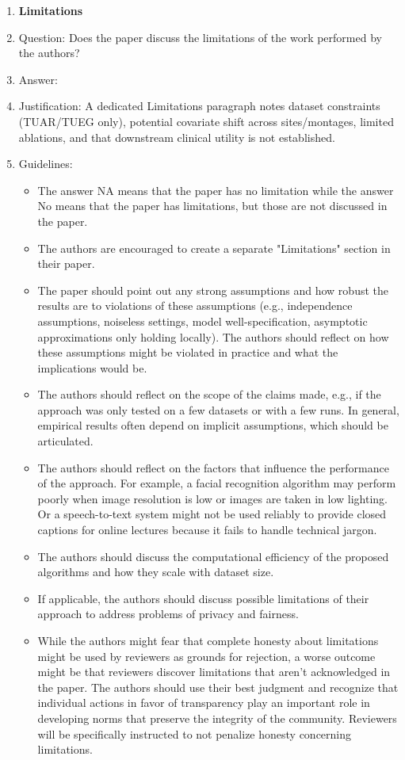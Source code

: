 \documentclass{article}
\begin{document}
\begin{enumerate}
\item {\bf Limitations}
    \item[] Question: Does the paper discuss the limitations of the work performed by the authors?
    \item[] Answer: \answerYes{}
    \item[] Justification: A dedicated Limitations paragraph notes dataset constraints (TUAR/TUEG only), potential covariate shift across sites/montages, limited ablations, and that downstream clinical utility is not established.
    \item[] Guidelines:
    \begin{itemize}
        \item The answer NA means that the paper has no limitation while the answer No means that the paper has limitations, but those are not discussed in the paper. 
        \item The authors are encouraged to create a separate "Limitations" section in their paper.
        \item The paper should point out any strong assumptions and how robust the results are to violations of these assumptions (e.g., independence assumptions, noiseless settings, model well-specification, asymptotic approximations only holding locally). The authors should reflect on how these assumptions might be violated in practice and what the implications would be.
        \item The authors should reflect on the scope of the claims made, e.g., if the approach was only tested on a few datasets or with a few runs. In general, empirical results often depend on implicit assumptions, which should be articulated.
        \item The authors should reflect on the factors that influence the performance of the approach. For example, a facial recognition algorithm may perform poorly when image resolution is low or images are taken in low lighting. Or a speech-to-text system might not be used reliably to provide closed captions for online lectures because it fails to handle technical jargon.
        \item The authors should discuss the computational efficiency of the proposed algorithms and how they scale with dataset size.
        \item If applicable, the authors should discuss possible limitations of their approach to address problems of privacy and fairness.
        \item While the authors might fear that complete honesty about limitations might be used by reviewers as grounds for rejection, a worse outcome might be that reviewers discover limitations that aren't acknowledged in the paper. The authors should use their best judgment and recognize that individual actions in favor of transparency play an important role in developing norms that preserve the integrity of the community. Reviewers will be specifically instructed to not penalize honesty concerning limitations.
    \end{itemize}


\end{enumerate}
\end{document}
